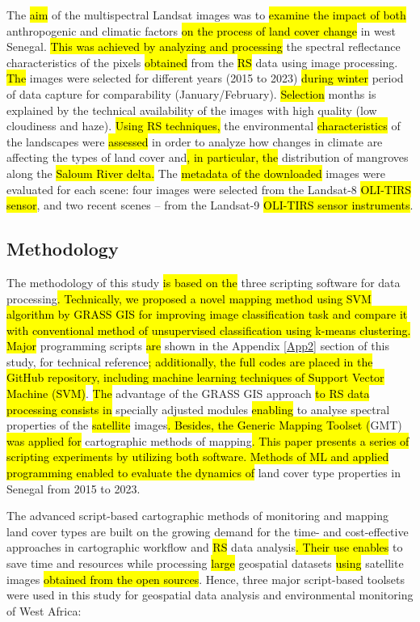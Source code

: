 \documentclass[earth,article,submit,pdftex,moreauthors]{Definitions/mdpi}
\begin{document}
The \hl{aim} of the multispectral Landsat images was to \hl{examine the impact of both} anthropogenic and climatic factors \hl{on the process of land cover change} in west Senegal. \hl{This was achieved by analyzing and processing} the spectral reflectance characteristics of the pixels \hl{obtained} from the \hl{RS} data using image processing. \hl{The} images were selected for different years (2015 to 2023) \hl{during winter} period of data capture for comparability (January/February). \hl{Selection} months is explained by the technical availability of the images with high quality (low cloudiness and haze). \hl{Using RS techniques,} the environmental \hl{characteristics} of the landscapes were \hl{assessed} in order to analyze how changes in climate are affecting the types of land cover and\hl{, in particular, the} distribution of mangroves along the \hl{Saloum River delta.} The \hl{metadata of the downloaded }images were  evaluated for each scene: four images were selected from the Landsat-8 \hl{OLI-TIRS sensor}, and two recent scenes -- from the Landsat-9 \hl{OLI-TIRS sensor instruments}. 

\subsection{Methodology}

The methodology of this study \hl{is based on the} three scripting software for data processing\hl{. Technically, we proposed a novel mapping method using SVM algorithm by GRASS GIS for improving image classification task and compare it with conventional method of unsupervised classification using k-means clustering. Major }programming scripts \hl{are} shown in the Appendix \ref{App2} section of this study, for technical reference\hl{; additionally, the full codes are placed in the GitHub repository, including machine learning techniques of Support Vector Machine (SVM)}. \hl{The} advantage of the GRASS GIS approach \hl{to RS data processing consists in} specially adjusted modules \hl{enabling }to analyse\hl{ }spectral properties of the \hl{satellite }images\hl{. Besides, the Generic Mapping Toolset (}GMT) \hl{was applied for }cartographic methods of mapping\hl{. This paper presents a series of scripting experiments by utilizing both software. Methods of ML and applied programming enabled to evaluate the dynamics of} land cover type properties in Senegal from 2015 to 2023. 

The advanced script-based cartographic methods of monitoring and mapping land cover types are built on the growing demand for the time- and cost-effective approaches in cartographic workflow and \hl{RS} data analysis\hl{. Their use enables} to save time and resources while processing \hl{large }geospatial datasets\hl{ using }satellite images \hl{obtained from the open sources}. Hence, three major script-based toolsets were used in this study for geospatial data analysis and environmental monitoring of West Africa:
\end{document}
